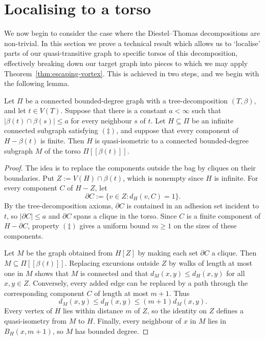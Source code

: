 \documentclass[a4paper]{amsart}
\begin{document}
\section{Localising to a torso}\label{sec:localising-torso}

We now begin to consider the case where the Diestel--Thomas decompositions are non-trivial. In this section we prove a technical result which allows us to `localise' parts of our quasi-transitive graph to specific torsos of this decomposition, effectively breaking down our target graph into pieces to which we may apply Theorem~\ref{thm:escaping-vortex}. This is achieved in two steps, and we begin with the following lemma. 

\begin{lemma}\label{lem:torso-localisation}
Let $\Pi$ be a connected bounded-degree graph with a tree-decomposition $(T,\beta)$, and let $t\in V(T)$. Suppose that there is a constant $a<\infty$ such that $|\beta(t)\cap\beta(s)|\leq a$ for every neighbour $s$ of $t$. Let $H\subseteq\Pi$ be an infinite connected subgraph satisfying $(\ddagger)$, and suppose that every component of $H-\beta(t)$ is finite. Then $H$ is quasi-isometric to a connected bounded-degree subgraph $M$ of the torso $\Pi[\![\beta(t)]\!]$.
\end{lemma}

\begin{proof}
The idea is to replace the components outside the bag by cliques on their boundaries. Put $Z:=V(H)\cap\beta(t)$, which is nonempty since $H$ is infinite.
For every component $C$ of $H-Z$, let 
$$
\partial C := \{v \in Z : d_H(v, C) = 1\}. 
$$
By the tree-decomposition axioms, $\partial C$ is contained in an adhesion set incident to $t$, so $|\partial C|\leq a$ and $\partial C$ spans a clique in the torso. Since $C$ is a finite component of $H-\partial C$, property $(\ddagger)$ gives a uniform bound $m\geq1$ on the sizes of these components.

Let $M$ be the graph obtained from $H[Z]$ by making each set $\partial C$ a clique. Then $M\subseteq\Pi[\![\beta(t)]\!]$. Replacing excursions outside $Z$ by walks of length at most one in $M$ shows that $M$ is connected and that $d_M(x,y)\leq d_H(x,y)$ for all $x,y\in Z$. Conversely, every added edge can be replaced by a path through the corresponding component $C$ of length at most $m+1$. Thus
$$
d_M(x,y)\leq d_H(x,y)\leq(m+1)d_M(x,y).
$$
Every vertex of $H$ lies within distance $m$ of $Z$, so the identity on $Z$ defines a quasi-isometry from $M$ to $H$. 
Finally, every neighbour of $x$ in $M$ lies in $B_H(x,m+1)$, so $M$ has bounded degree.
\end{proof}
\end{document}
